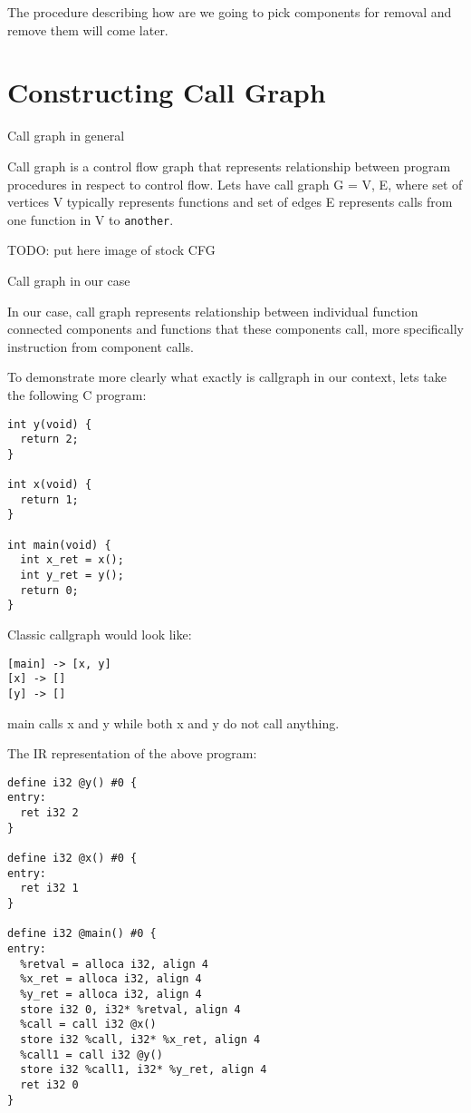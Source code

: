 \documentclass[12pt, twoside]{fithesis2}
\renewcommand{\_}{\leavevmode \kern0.07em\vbox{\hrule width0.4em}}
\begin{document}
The procedure describing how are we going to pick components for removal and
remove them will come later.

\section{Constructing Call Graph}
\label{sec:design-callgraph}


Call graph in general

Call graph is a control flow graph that represents relationship between program
procedures in respect to control flow. Lets have call graph G = {V, E}, where
set of vertices V typically represents functions and set of edges E represents
calls from one function in V to \texttt{another}.

TODO: put here image of stock CFG


Call graph in our case

In our case, call graph represents relationship between individual function
connected components and functions that these components call, more
specifically instruction from component calls.

To demonstrate more clearly what exactly is callgraph in our context, lets take
the following C program:

\begin{verbatim}
int y(void) {
  return 2;
}

int x(void) {
  return 1;
}

int main(void) {
  int x_ret = x();
  int y_ret = y();
  return 0;
}
\end{verbatim}

Classic callgraph would look like:

\begin{verbatim}
[main] -> [x, y]
[x] -> []
[y] -> []
\end{verbatim}

main calls x and y while both x and y do not call anything.

The IR representation of the above program:

\begin{verbatim}
define i32 @y() #0 {
entry:
  ret i32 2
}

define i32 @x() #0 {
entry:
  ret i32 1
}

define i32 @main() #0 {
entry:
  %retval = alloca i32, align 4
  %x_ret = alloca i32, align 4
  %y_ret = alloca i32, align 4
  store i32 0, i32* %retval, align 4
  %call = call i32 @x()
  store i32 %call, i32* %x_ret, align 4
  %call1 = call i32 @y()
  store i32 %call1, i32* %y_ret, align 4
  ret i32 0
}
\end{verbatim}
\end{document}
